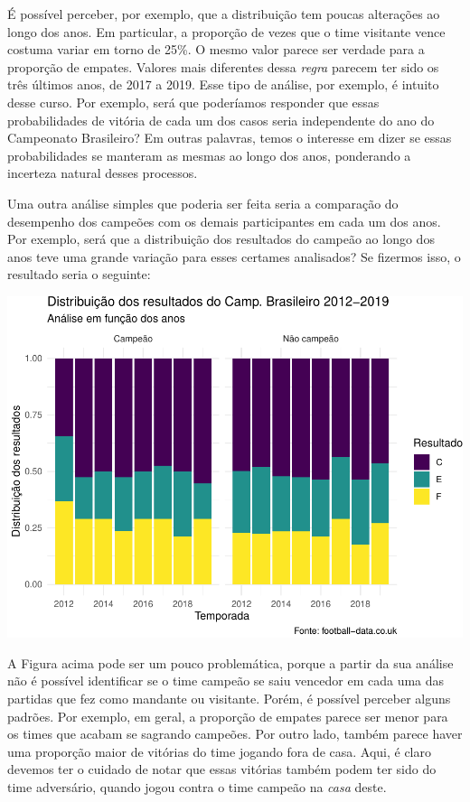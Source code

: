 \documentclass[]{book}
\begin{document}
É possível perceber, por exemplo, que a distribuição tem poucas alterações ao longo dos anos. Em particular, a proporção de vezes que o time visitante vence costuma variar em torno de 25\%. O mesmo valor parece ser verdade para a proporção de empates. Valores mais diferentes dessa \emph{regra} parecem ter sido os três últimos anos, de 2017 a 2019. Esse tipo de análise, por exemplo, é intuito desse curso. Por exemplo, será que poderíamos responder que essas probabilidades de vitória de cada um dos casos seria independente do ano do Campeonato Brasileiro? Em outras palavras, temos o interesse em dizer se essas probabilidades se manteram as mesmas ao longo dos anos, ponderando a incerteza natural desses processos.

Uma outra análise simples que poderia ser feita seria a comparação do desempenho dos campeões com os demais participantes em cada um dos anos. Por exemplo, será que a distribuição dos resultados do campeão ao longo dos anos teve uma grande variação para esses certames analisados? Se fizermos isso, o resultado seria o seguinte:

\begin{center}\includegraphics[width=0.8\linewidth]{notas_livro_files/figure-latex/graf9-1} \end{center}

A Figura acima pode ser um pouco problemática, porque a partir da sua análise não é possível identificar se o time campeão se saiu vencedor em cada uma das partidas que fez como mandante ou visitante. Porém, é possível perceber alguns padrões. Por exemplo, em geral, a proporção de empates parece ser menor para os times que acabam se sagrando campeões. Por outro lado, também parece haver uma proporção maior de vitórias do time jogando fora de casa. Aqui, é claro devemos ter o cuidado de notar que essas vitórias também podem ter sido do time adversário, quando jogou contra o time campeão na \emph{casa} deste.
\end{document}
